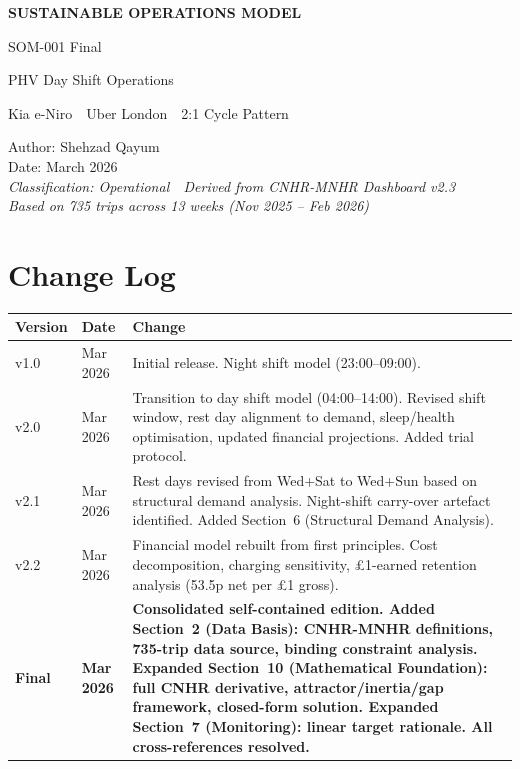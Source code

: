 \documentclass[a4paper,11pt]{article}
\begin{document}
\begin{titlepage}
\centering
\vspace*{6cm}
{\Huge\bfseries\color{headblue} SUSTAINABLE OPERATIONS MODEL\par}
\vspace{0.5cm}
{\Large\color{accentblue} SOM-001 Final\par}
\vspace{1.5cm}
{\large PHV Day Shift Operations\par}
{\color{accentblue} Kia e-Niro~\textbullet{}~Uber London~\textbullet{}~2:1 Cycle Pattern\par}
\vspace{2cm}
Author: Shehzad Qayum\\
Date: March 2026\\
\vspace{0.8cm}
{\small\itshape\color{accentblue} Classification: Operational~\textbullet{}~Derived from CNHR-MNHR Dashboard v2.3\\
Based on 735 trips across 13 weeks (Nov 2025 -- Feb 2026)}
\end{titlepage}

\section*{Change Log}

\begin{tabularx}{\textwidth}{l l X}
\toprule
\textbf{Version} & \textbf{Date} & \textbf{Change} \\
\midrule
v1.0 & Mar 2026 & Initial release. Night shift model (23:00--09:00). \\
v2.0 & Mar 2026 & Transition to day shift model (04:00--14:00). Revised shift window, rest day alignment to demand, sleep/health optimisation, updated financial projections. Added trial protocol. \\
v2.1 & Mar 2026 & Rest days revised from Wed+Sat to Wed+Sun based on structural demand analysis. Night-shift carry-over artefact identified. Added Section~6 (Structural Demand Analysis). \\
v2.2 & Mar 2026 & Financial model rebuilt from first principles. Cost decomposition, charging sensitivity, \pounds1-earned retention analysis (53.5p net per \pounds1 gross). \\
\textbf{Final} & \textbf{Mar 2026} & \textbf{Consolidated self-contained edition. Added Section~2 (Data Basis): CNHR-MNHR definitions, 735-trip data source, binding constraint analysis. Expanded Section~10 (Mathematical Foundation): full CNHR derivative, attractor/inertia/gap framework, closed-form solution. Expanded Section~7 (Monitoring): linear target rationale. All cross-references resolved.} \\
\bottomrule
\end{tabularx}
\end{document}
